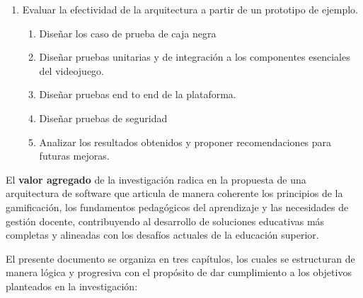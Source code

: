 \begin{enumerate}
	\item Evaluar la efectividad de la arquitectura a partir de un prototipo de ejemplo.  
	\begin{enumerate}
		\item Diseñar los caso de prueba de caja negra
		\item Diseñar pruebas unitarias y de integración a los componentes esenciales del videojuego.  
		\item Diseñar pruebas end to end de la plataforma.
		\item Diseñar pruebas de seguridad
		\item Analizar los resultados obtenidos y proponer recomendaciones para futuras mejoras.  
	\end{enumerate}
\end{enumerate}


El \textbf{valor agregado} de la investigación radica en la propuesta de una arquitectura de software que articula de manera coherente los principios de la gamificación, los fundamentos pedagógicos del aprendizaje y las necesidades de gestión docente, contribuyendo al desarrollo de soluciones educativas más completas y alineadas con los desafíos actuales de la educación superior.

El presente documento se organiza en tres capítulos, los cuales se estructuran de manera lógica y progresiva con el propósito de dar cumplimiento a los objetivos planteados en la investigación:

